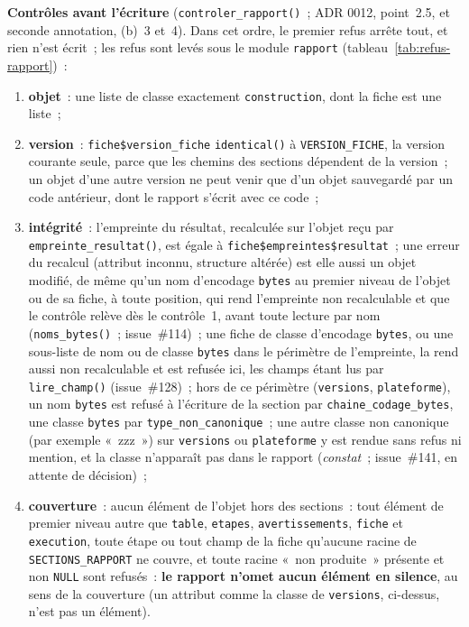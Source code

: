 \documentclass[a4paper,11pt]{article}
\newcommand{\code}[1]{\texttt{\small #1}}
\begin{document}
\medskip
\noindent
\textbf{Contrôles avant l'écriture} (\code{controler\_rapport()}~; ADR 0012,
point~2.5, et seconde annotation, (b)~3 et~4). Dans cet ordre, le premier
refus arrête tout, et rien n'est écrit~; les refus sont levés sous le
module \code{rapport} (tableau~\ref{tab:refus-rapport})~:
\begin{enumerate}[leftmargin=*, itemsep=2pt]
  \item \textbf{objet}~: une liste de classe exactement \code{construction},
    dont la fiche est une liste~;
  \item \textbf{version}~: \code{fiche\$version\_fiche} \code{identical()} à
    \code{VERSION\_FICHE}, la version courante seule, parce que les chemins
    des sections dépendent de la version~; un objet d'une autre version ne
    peut venir que d'un objet sauvegardé par un code antérieur, dont le
    rapport s'écrit avec ce code~;
  \item \textbf{intégrité}~: l'empreinte du résultat, recalculée sur l'objet
    reçu par \code{empreinte\_resultat()}, est égale à
    \code{fiche\$empreintes\$resultat}~; une erreur du recalcul (attribut
    inconnu, structure altérée) est elle aussi un objet modifié, de même
    qu'un nom d'encodage \code{bytes} au premier niveau de l'objet ou de sa
    fiche, à toute position, qui rend l'empreinte non recalculable et que le
    contrôle relève dès le contrôle~1, avant toute lecture par nom
    (\code{noms\_bytes()}~; issue~\#114)~; une fiche de classe
    d'encodage \code{bytes}, ou une sous-liste de nom ou de classe
    \code{bytes} dans le périmètre de l'empreinte, la rend aussi non
    recalculable et est refusée ici, les champs étant lus par
    \code{lire\_champ()} (issue~\#128)~; hors de ce périmètre
    (\code{versions}, \code{plateforme}), un nom \code{bytes} est refusé
    à l'écriture de la section par \code{chaine\_codage\_bytes}, une
    classe \code{bytes} par \code{type\_non\_canonique}~; une autre classe
    non canonique (par exemple «~zzz~») sur \code{versions} ou
    \code{plateforme} y est rendue sans refus ni mention, et la classe
    n'apparaît pas dans le rapport (\emph{constat}~; issue~\#141, en attente
    de décision)~;
  \item \textbf{couverture}~: aucun élément de l'objet hors des sections~:
    tout élément de premier niveau autre que \code{table}, \code{etapes},
    \code{avertissements}, \code{fiche} et \code{execution}, toute étape ou
    tout champ de la fiche qu'aucune racine de \code{SECTIONS\_RAPPORT} ne
    couvre, et toute racine «~non produite~» présente et non \code{NULL}
    sont refusés~: \textbf{le rapport n'omet aucun élément en silence}, au
    sens de la couverture (un attribut comme la classe de \code{versions},
    ci-dessus, n'est pas un élément).
\end{enumerate}
\end{document}
